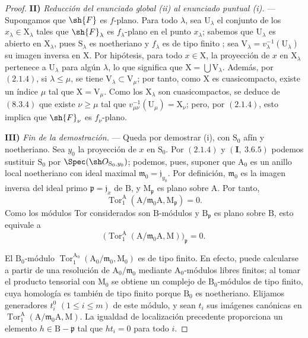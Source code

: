 \begin{proof}
\medskip
\noindent\textbf{II)} \emph{Reducción del enunciado global (ii) al enunciado puntual (i).} --- Supongamos que $\sh{F}$ es $f$-plano. Para todo $\lambda$, sea $\mathrm{U}_\lambda$ el conjunto de los $x_\lambda\in\mathrm{X}_\lambda$ tales que $\sh{F}_\lambda$ es $f_\lambda$-plano en el punto $x_\lambda$; sabemos que $\mathrm{U}_\lambda$ es abierto en $\mathrm{X}_\lambda$, pues $\mathrm{S}_\lambda$ es noetheriano y $f_\lambda$ es de tipo finito ; sea $\mathrm{V}_\lambda=v_\lambda^{-1}(\mathrm{U}_\lambda)$ su imagen inversa en $\mathrm{X}$. Por hipótesis, para todo $x\in\mathrm{X}$, la proyección de $x$ en $\mathrm{X}_\lambda$ pertenece a $\mathrm{U}_\lambda$ para algún $\lambda$, lo que significa que $\mathrm{X}=\bigcup\mathrm{V}_\lambda$. Además, por $(2.1.4)$, si $\lambda\leqslant\mu$, se tiene $\mathrm{V}_\lambda\subset\mathrm{V}_\mu$; por tanto, como $\mathrm{X}$ es cuasicompacto, existe un índice $\mu$ tal que $\mathrm{X}=\mathrm{V}_\mu$. Como los $\mathrm{X}_\lambda$ son cuasicompactos, se deduce de $(8.3.4)$ que existe $\nu\geqslant\mu$ tal que $v_{\mu\nu}^{-1}(\mathrm{U}_\mu)=\mathrm{X}_\nu$; pero, por $(2.1.4)$, esto implica que $\sh{F}_\nu$ es $f_\nu$-plano.

\medskip
\noindent\textbf{III)} \emph{Fin de la demostración.} --- Queda por demostrar
(i), con $\mathrm S_0$ afín y noetheriano. Sea $y_0$ la
proyección de $x$ en $\mathrm S_0$. Por $(2.1.4)$ y
$(\mathbf I,~3.6.5)$ podemos sustituir $\mathrm S_0$ por
$\Spec(\sh O_{\mathrm S_0,y_0})$; podemos, pues, suponer que
$\mathrm A_0$ es un anillo local noetheriano con ideal maximal
$\mathfrak m_0=\mathfrak j_{y_0}$. Por definición,
$\mathfrak m_0$ es la imagen inversa del ideal primo
$\mathfrak p=\mathfrak j_x$ de $\mathrm B$, y
$\mathrm M_{\mathfrak p}$ es plano sobre $\mathrm A$. Por tanto,
\[
  \operatorname{Tor}_1^\mathrm A
  (\mathrm A/\mathfrak m_0\mathrm A,\mathrm M_{\mathfrak p})=0.
\]
Como los módulos Tor considerados son $\mathrm B$-módulos y
$\mathrm B_{\mathfrak p}$ es plano sobre $\mathrm B$, esto equivale
a
\[
  \bigl(\operatorname{Tor}_1^\mathrm A
  (\mathrm A/\mathfrak m_0\mathrm A,\mathrm M)\bigr)_{\mathfrak p}=0.
\]

El $\mathrm B_0$-módulo
$\operatorname{Tor}_1^{\mathrm A_0}
(\mathrm A_0/\mathfrak m_0,\mathrm M_0)$ es de tipo finito. En efecto, puede
calcularse a partir de una resolución de $\mathrm A_0/\mathfrak m_0$ mediante
$\mathrm A_0$-módulos libres finitos; al tomar el producto tensorial con $\mathrm M_0$ se obtiene un
complejo de $\mathrm B_0$-módulos de tipo finito, cuya homología es también
de tipo finito porque $\mathrm B_0$ es noetheriano. Elijamos generadores
$t_i^0$ $(1\leqslant i\leqslant m)$ de este módulo, y sean $t_i$
sus imágenes canónicas en
$\operatorname{Tor}_1^\mathrm A
(\mathrm A/\mathfrak m_0\mathrm A,\mathrm M)$. La igualdad de localización
precedente proporciona un elemento
$h\in\mathrm B-\mathfrak p$ tal que $ht_i=0$ para todo $i$.


\end{proof}
